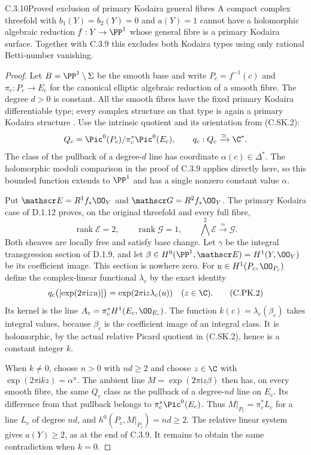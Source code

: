 \begin{idstatement}{C.3.10}{Proved exclusion of primary Kodaira general fibres}
\label{st:C.3.10}
A compact complex threefold with $b_1(Y)=b_2(Y)=0$ and
$a(Y)=1$ cannot have a holomorphic algebraic reduction
$f:Y\to\PP^1$ whose general fibre is a primary Kodaira
surface. Together with C.3.9 this excludes both Kodaira
types using only rational Betti-number vanishing.
\end{idstatement}
\begin{proof}
Let $B=\PP^1\setminus\Sigma$ be the smooth base and write
$P_c=f^{-1}(c)$ and $\pi_c:P_c\to E_c$ for the canonical
elliptic algebraic reduction of a smooth fibre. The degree
$d>0$ is constant. All the smooth fibres have the fixed
primary Kodaira differentiable type; every complex structure
on that type is again a primary Kodaira structure
\cite[pp.~373--374]{Borcea1984}.
Use the intrinsic quotient and its orientation from (C.SK.2):
\[
 Q_c=\Pic^0(P_c)/\pi_c^*\Pic^0(E_c),\qquad
 q_c:Q_c\xrightarrow{\simeq}\C^*.
\]
The class of the pullback of a degree-$d$ line has coordinate
$\alpha(c)\in\Delta^*$. The holomorphic moduli comparison
in the proof of C.3.9 applies directly here, so this bounded
function extends to $\PP^1$ and has a single nonzero
constant value $\alpha$.

Put $\mathscr E=R^1f_*\OO_Y$ and
$\mathscr G=R^2f_*\OO_Y$. The primary Kodaira case of
D.1.12 proves, on the original threefold and every full fibre,
\[
 \operatorname{rank}\mathscr E=2,\qquad
 \operatorname{rank}\mathscr G=1,\qquad
 \bigwedge^2\mathscr E\xrightarrow{\simeq}\mathscr G.
\tag{C.PK.1}
\]
Both sheaves are locally free and satisfy base change.
Let $\gamma$ be the integral transgression section of D.1.9,
and let $\beta\in H^0(\PP^1,\mathscr E)=H^1(Y,\OO_Y)$
be its coefficient image. This section is nowhere zero.
For $u\in H^1(P_c,\OO_{P_c})$ define the complex-linear
functional $\lambda_c$ by the exact identity
\[
 q_c\bigl([\exp(2\pi\mathrm i z u)]\bigr)
     =\exp(2\pi\mathrm i z\lambda_c(u))
     \quad(z\in\C).
\tag{C.PK.2}
\]
Its kernel is the line
$A_c=\pi_c^*H^1(E_c,\OO_{E_c})$.
The function $k(c)=\lambda_c(\beta_c)$ takes integral
values, because $\beta_c$ is the coefficient image of
an integral class. It is holomorphic, by the actual relative
Picard quotient in (C.SK.2), hence is a constant integer $k$.

When $k\ne0$, choose $n>0$ with $nd\ge2$ and choose
$z\in\C$ with $\exp(2\pi\mathrm i kz)=\alpha^n$.
The ambient line $M=\exp(2\pi\mathrm i z\beta)$ then
has, on every smooth fibre, the same $Q_c$ class as the
pullback of a degree-$nd$ line on $E_c$. Its difference
from that pullback belongs to $\pi_c^*\Pic^0(E_c)$.
Thus
$M|_{P_c}=\pi_c^*L_c$ for a line $L_c$ of degree $nd$,
and $h^0(P_c,M|_{P_c})=nd\ge2$. The relative linear
system gives $a(Y)\ge2$, as at the end of C.3.9.
It remains to obtain the same contradiction when $k=0$.


\end{proof}
